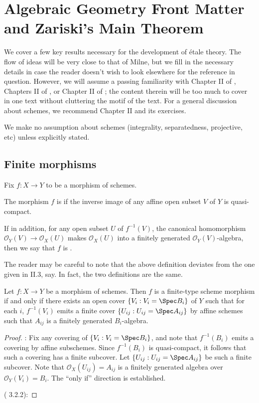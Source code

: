 \chapter{Algebraic Geometry Front Matter and Zariski's Main 
Theorem}
\label{sect_zariski}

\renewcommand{\O}{\mathcal{O}}

We cover a few key results necessary for the development of 
\'etale theory. The flow of ideas will be very close to that of 
Milne, but we fill in the necessary details in case the reader 
doesn't wish to look elsewhere for the reference in question. 
However, we will assume a passing familiarity with Chapter II of 
\cite{Hart}, Chapters II of \cite{Liu}, or Chapter II of 
\cite{Mum}; the content therein will be too much to cover in one 
text without cluttering the motif of the text. For a general 
discussion about schemes, we recommend \cite{Hart} Chapter II
and its exercises.

We make no assumption about schemes (integrality, separatedness, 
projective, etc) unless explicitly stated. 

\section{Finite morphisms}

Fix $f: X \to Y$ to be a morphism of schemes.

\begin{defn}
The morphism $f$ is 
if the inverse image of any affine open subset $V$ of $Y$ is
quasi-compact. 

If in addition, for any open subset $U$ of $f^{-1}(V)$, the 
canonical homomorphism $\O_Y(V) \to \O_X(U)$ makes $\O_X(U)$ into 
a finitely generated $\O_Y(V)$-algebra, then we say that $f$ is 
.
\end{defn}

The reader may be careful to note that the above definition
deviates from the one given in \cite{Hart} II.3, say. In fact,
the two definitions are the same.

\begin{prop}
Let $f: X \to Y$ be a morphism of schemes. Then $f$ is a 
finite-type scheme morphism if and only if there exists an open 
cover $\{V_i : V_i = \Spec B_i \}$ of $Y$ such that for each $i$, 
$f^{-1}(V_i)$ emits a finite cover $\{U_{ij} : U_{ij} = \Spec 
A_{ij}\}$ by affine schemes such that $A_{ij}$ is a finitely 
generated $B_i$-algebra.
\end{prop}
\begin{proof}
\pfitem{$\Rightarrow$}: Fix any covering of $\{V_i : V_i = \Spec 
B_i\}$, and note that $f^{-1}(B_i)$ emits a covering by affine
subschemes. Since $f^{-1}(B_i)$ is quasi-compact, it follows that
such a covering has a finite subcover. Let $\{U_{ij} : U_{ij} = 
\Spec A_{ij}\}$ be such a finite subcover. Note that $\O_X(U_{ij}) 
= A_{ij}$ is a finitely generated algebra over $\O_Y(V_i) = B_i$.
The ``only if'' direction is established.

\pfitem{$\Leftarrow$} (\cite{Liu} 3.2.2):
\end{proof}

